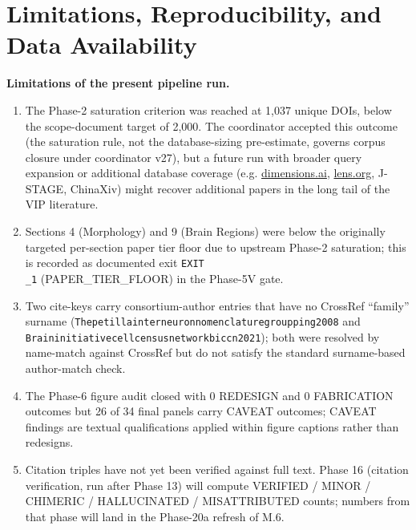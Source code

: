 \documentclass[11pt]{article}
\begin{document}
\bigskip

\section{Limitations, Reproducibility, and Data Availability}\label{sec-methods-limitations-reproducibility}

\textbf{Limitations of the present pipeline run.}

\begin{enumerate}
\item The Phase-2 saturation criterion was reached at 1,037 unique DOIs, below the scope-document target of 2,000. The coordinator accepted this outcome (the saturation rule, not the database-sizing pre-estimate, governs corpus closure under coordinator v27), but a future run with broader query expansion or additional database coverage (e.g. \href{http://dimensions.ai}{dimensions.ai}, \href{http://lens.org}{lens.org}, J-STAGE, ChinaXiv) might recover additional papers in the long tail of the VIP literature.
\item Sections 4 (Morphology) and 9 (Brain Regions) were below the originally targeted per-section paper tier floor due to upstream Phase-2 saturation; this is recorded as documented exit \texttt{EXIT\\_1} (PAPER\_TIER\_FLOOR) in the Phase-5V gate.
\item Two cite-keys carry consortium-author entries that have no CrossRef ``family'' surname (\texttt{Thepetillainterneuronnomenclaturegroupping2008} and \texttt{Braininitiativecellcensusnetworkbiccn2021}); both were resolved by name-match against CrossRef but do not satisfy the standard surname-based author-match check.
\item The Phase-6 figure audit closed with 0 REDESIGN and 0 FABRICATION outcomes but 26 of 34 final panels carry CAVEAT outcomes; CAVEAT findings are textual qualifications applied within figure captions rather than redesigns.
\item Citation triples have not yet been verified against full text. Phase 16 (citation verification, run after Phase 13) will compute VERIFIED / MINOR / CHIMERIC / HALLUCINATED / MISATTRIBUTED counts; numbers from that phase will land in the Phase-20a refresh of M.6.
\end{enumerate}
\end{document}
